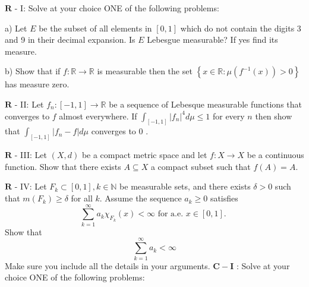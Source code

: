 \documentclass[14pt]{extarticle}
\begin{document}
$\mathbf{R}$ - I: Solve at your choice ONE of the following problems:

a) Let $E$ be the subset of all elements in $[0,1]$ which do not contain the digits 3 and 9 in their decimal expansion. Is $E$ Lebesgue measurable? If yes find its measure.

b) Show that if $f: \mathbb{R} \rightarrow \mathbb{R}$ is measurable then the set $\left\{x \in \mathbb{R}: \mu\left(f^{-1}(x)\right)>0\right\}$ has measure zero.
\newpage

$\mathbf{R}$ - II: Let $f_{n}:[-1,1] \rightarrow \mathbb{R}$ be a sequence of Lebesque measurable functions that converges to $f$ almost everywhere. If $\int_{[-1,1]}\left|f_{n}\right|^{4} d \mu \leq 1$ for every $n$ then show that $\int_{[-1,1]}\left|f_{n}-f\right| d \mu$ converges to 0 .
\newpage

$\mathbf{R}$ - III: Let $(X, d)$ be a compact metric space and let $f: X \rightarrow X$ be a continuous function. Show that there exists $A \subseteq X$ a compact subset such that $f(A)=A$.
\newpage

$\mathbf{R}$ - IV: Let $F_{k} \subset[0,1], k \in \mathbb{N}$ be measurable sets, and there exists $\delta>0$ such that $m\left(F_{k}\right) \geq \delta$ for all $k$. Assume the sequence $a_{k} \geq 0$ satisfies
$$
\sum_{k=1}^{\infty} a_{k} \chi_{F_{k}}(x)<\infty \text { for a.e. } x \in[0,1] \text {. }
$$
Show that
$$
\sum_{k=1}^{\infty} a_{k}<\infty
$$
Make sure you include all the details in your arguments.
\newpage
$\mathbf{C}-\mathbf{I}$ : Solve at your choice ONE of the following problems:
\end{document}
